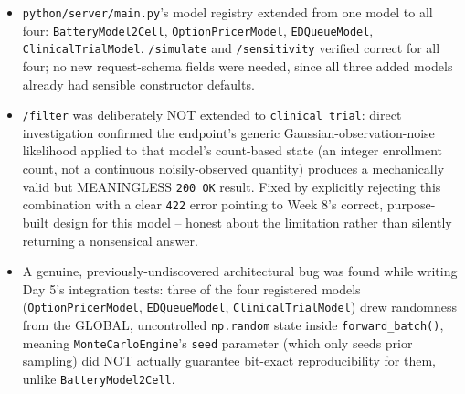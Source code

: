 \documentclass[11pt]{article}
\begin{document}
\begin{itemize}[leftmargin=*]
  \item \texttt{python/server/main.py}'s model registry extended from
    one model to all four: \texttt{BatteryModel2Cell},
    \texttt{OptionPricerModel}, \texttt{EDQueueModel},
    \texttt{ClinicalTrialModel}. \texttt{/simulate} and
    \texttt{/sensitivity} verified correct for all four; no new
    request-schema fields were needed, since all three added models
    already had sensible constructor defaults.
  \item \texttt{/filter} was deliberately NOT extended to
    \texttt{clinical\_trial}: direct investigation confirmed the
    endpoint's generic Gaussian-observation-noise likelihood applied
    to that model's count-based state (an integer enrollment count,
    not a continuous noisily-observed quantity) produces a
    mechanically valid but MEANINGLESS \texttt{200 OK} result. Fixed
    by explicitly rejecting this combination with a clear
    \texttt{422} error pointing to Week 8's correct, purpose-built
    design for this model -- honest about the limitation rather than
    silently returning a nonsensical answer.
  \item A genuine, previously-undiscovered architectural bug was
    found while writing Day 5's integration tests: three of the four
    registered models (\texttt{OptionPricerModel},
    \texttt{EDQueueModel}, \texttt{ClinicalTrialModel}) drew
    randomness from the GLOBAL, uncontrolled \texttt{np.random} state
    inside \texttt{forward\_batch()}, meaning \texttt{MonteCarloEngine}'s
    \texttt{seed} parameter (which only seeds prior sampling) did NOT
    actually guarantee bit-exact reproducibility for them, unlike
    \texttt{BatteryModel2Cell}.


\end{itemize}
\end{document}

